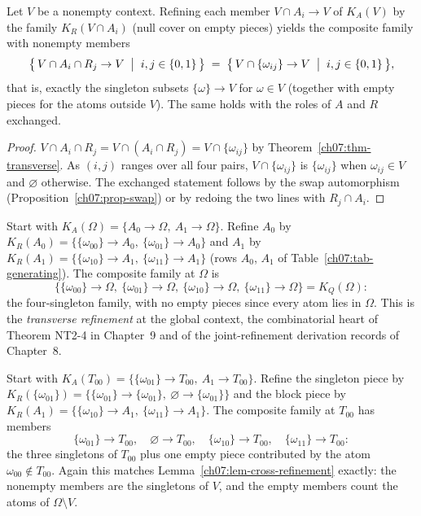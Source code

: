 \begin{lemma}\label{ch07:lem-cross-refinement}
Let $V$ be a nonempty context. Refining each member $V\cap A_{i}\to V$ of $K_{A}(V)$ by the family $K_{R}(V\cap A_{i})$ (null cover on empty pieces) yields the composite family with nonempty members
\[
\bigl\{\,V\cap A_{i}\cap R_{j}\to V \;\bigm|\; i,j\in\{0,1\}\,\bigr\}
\;=\;
\bigl\{\,V\cap\{\omega_{ij}\}\to V \;\bigm|\; i,j\in\{0,1\}\,\bigr\},
\]
that is, exactly the singleton subsets $\{\omega\}\to V$ for $\omega\in V$ (together with empty pieces for the atoms outside $V$). The same holds with the roles of $A$ and $R$ exchanged.
\end{lemma}

\begin{proof}
$V\cap A_{i}\cap R_{j}=V\cap(A_{i}\cap R_{j})=V\cap\{\omega_{ij}\}$ by Theorem~\ref{ch07:thm-transverse}. As $(i,j)$ ranges over all four pairs, $V\cap\{\omega_{ij}\}$ is $\{\omega_{ij}\}$ when $\omega_{ij}\in V$ and $\varnothing$ otherwise. The exchanged statement follows by the swap automorphism (Proposition~\ref{ch07:prop-swap}) or by redoing the two lines with $R_{j}\cap A_{i}$.
\end{proof}

\begin{example}\label{ch07:ex-composite-global}
Start with $K_{A}(\Omega)=\{A_{0}\to\Omega,\ A_{1}\to\Omega\}$. Refine $A_{0}$ by $K_{R}(A_{0})=\{\{\omega_{00}\}\to A_{0},\ \{\omega_{01}\}\to A_{0}\}$ and $A_{1}$ by $K_{R}(A_{1})=\{\{\omega_{10}\}\to A_{1},\ \{\omega_{11}\}\to A_{1}\}$ (rows $A_{0}$, $A_{1}$ of Table~\ref{ch07:tab-generating}). The composite family at $\Omega$ is
\[
\bigl\{\{\omega_{00}\}\to\Omega,\ \{\omega_{01}\}\to\Omega,\ \{\omega_{10}\}\to\Omega,\ \{\omega_{11}\}\to\Omega\bigr\}
=K_{Q}(\Omega):
\]
the four-singleton family, with no empty pieces since every atom lies in $\Omega$. This is the \emph{transverse refinement} at the global context, the combinatorial heart of Theorem NT2-4 in Chapter~9 and of the joint-refinement derivation records of Chapter~8.
\end{example}

\begin{example}\label{ch07:ex-composite-triple}
Start with $K_{A}(T_{00})=\{\{\omega_{01}\}\to T_{00},\ A_{1}\to T_{00}\}$. Refine the singleton piece by $K_{R}(\{\omega_{01}\})=\{\{\omega_{01}\}\to\{\omega_{01}\},\ \varnothing\to\{\omega_{01}\}\}$ and the block piece by $K_{R}(A_{1})=\{\{\omega_{10}\}\to A_{1},\ \{\omega_{11}\}\to A_{1}\}$. The composite family at $T_{00}$ has members
\[
\{\omega_{01}\}\to T_{00},\quad \varnothing\to T_{00},\quad \{\omega_{10}\}\to T_{00},\quad \{\omega_{11}\}\to T_{00}:
\]
the three singletons of $T_{00}$ plus one empty piece contributed by the atom $\omega_{00}\notin T_{00}$. Again this matches Lemma~\ref{ch07:lem-cross-refinement} exactly: the nonempty members are the singletons of $V$, and the empty members count the atoms of $\Omega\setminus V$.
\end{example}

